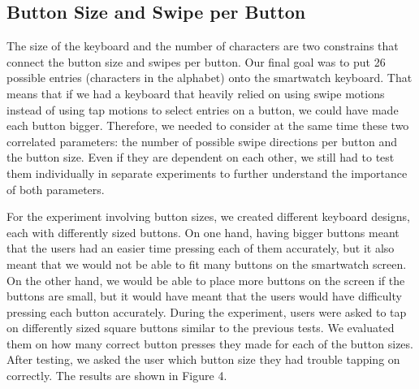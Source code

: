 \subsection{Button Size and Swipe per Button}
The size of the keyboard and the number of characters are two constrains that connect the button size and swipes per button. Our final goal was to put 26 possible entries (characters in the alphabet) onto the smartwatch keyboard. That means that if we had a keyboard that heavily relied on using swipe motions instead of using tap motions to select entries on a button, we could have made each button bigger. Therefore, we needed to consider at the same time these two correlated parameters: the number of possible swipe directions per button and the button size. Even if they are dependent on each other, we still had to test them individually in separate experiments to further understand the importance of both parameters.

For the experiment involving button sizes, we created different keyboard designs, each with differently sized buttons. On one hand, having bigger buttons meant that the users had an easier time pressing each of them accurately, but it also meant that we would not be able to fit many buttons on the smartwatch screen. On the other hand, we would be able to place more buttons on the screen if the buttons are small, but it would have meant that the users would have difficulty pressing each button accurately. During the experiment, users were asked to tap on differently sized square buttons similar to the previous tests. We evaluated them on how many correct button presses they made for each of the button sizes. After testing, we asked the user which button size they had trouble tapping on correctly. The results are shown in Figure 4.

